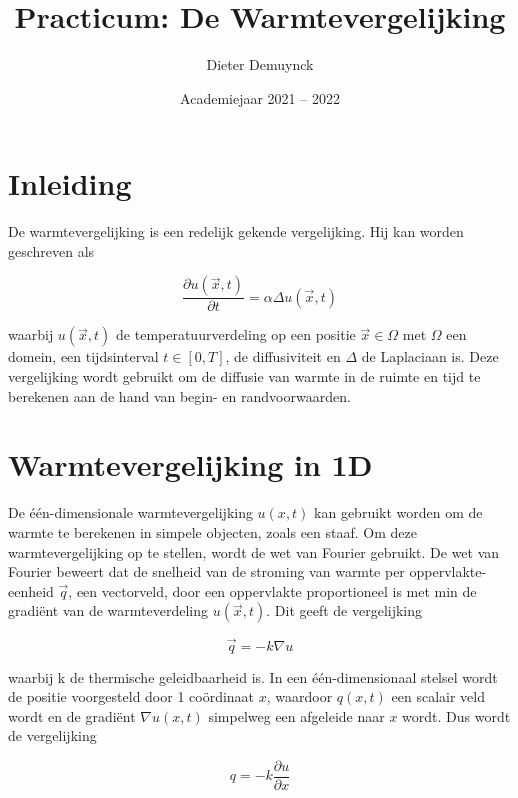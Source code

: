 \documentclass[a4paper,kulak]{kulakarticle} %
\date{Academiejaar 2021 -- 2022}
\title{Practicum: De Warmtevergelijking}
\author{Dieter Demuynck}
\begin{document}
\maketitle

\section*{Inleiding}

De warmtevergelijking is een redelijk gekende vergelijking. Hij kan worden geschreven als

\begin{equation}
	\frac{\partial u(\vec{x}, t)}{\partial t} = \alpha \Delta u(\vec{x}, t)
\end{equation}

waarbij $u(\vec{x}, t)$ de temperatuurverdeling op een positie $\vec{x} \in \Omega$ met $\Omega$ een domein, een tijdsinterval $t \in [0, T]$, de diffusiviteit en $\Delta$ de Laplaciaan is. Deze vergelijking wordt gebruikt om de diffusie van warmte in de ruimte en tijd te berekenen aan de hand van begin- en randvoorwaarden.  %

\section{Warmtevergelijking in 1D}

De één-dimensionale warmtevergelijking $u(x, t)$ kan gebruikt worden om de warmte te berekenen in simpele objecten, zoals een staaf. Om deze warmtevergelijking op te stellen, wordt de wet van Fourier gebruikt. %
De wet van Fourier beweert dat de snelheid van de stroming van warmte per oppervlakte-eenheid $\vec{q}$, een vectorveld, door een oppervlakte proportioneel is met min de gradiënt van de warmteverdeling $u(\vec{x}, t)$. Dit geeft de vergelijking

\begin{equation}
	\vec{q} = - k \nabla u
\end{equation}

waarbij k de thermische geleidbaarheid is.
In een één-dimensionaal stelsel wordt de positie voorgesteld door 1 coördinaat $x$, waardoor $q(x, t)$ een scalair veld wordt en de gradiënt $\nabla u (x, t)$ simpelweg een afgeleide naar $x$ wordt. Dus  wordt de vergelijking

\begin{equation}
	q = -k\frac{\partial u}{\partial x}
\end{equation}
\end{document}
